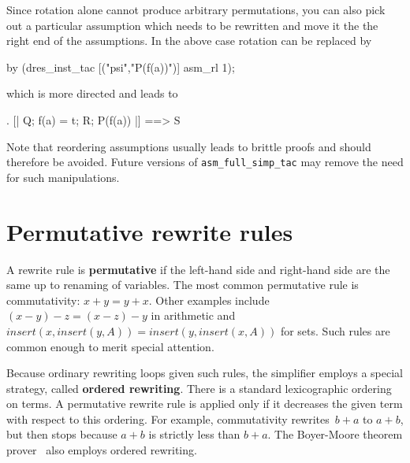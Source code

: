 Since rotation alone cannot produce arbitrary permutations, you can also pick
out a particular assumption which needs to be rewritten and move it the the
right end of the assumptions. In the above case rotation can be replaced by
\begin{ttbox}
by (dres_inst_tac [("psi","P(f(a))")] asm_rl 1);
\end{ttbox}
which is more directed and leads to
\begin{ttbox}
{. [| Q; f(a) = t; R; P(f(a)) |] ==> S}
\end{ttbox}

Note that reordering assumptions usually leads to brittle proofs and should
therefore be avoided. Future versions of \verb$asm_full_simp_tac$ may remove
the need for such manipulations.

\section{Permutative rewrite rules}

A rewrite rule is {\bf permutative} if the left-hand side and right-hand
side are the same up to renaming of variables.  The most common permutative
rule is commutativity: $x+y = y+x$.  Other examples include $(x-y)-z =
(x-z)-y$ in arithmetic and $insert(x,insert(y,A)) = insert(y,insert(x,A))$
for sets.  Such rules are common enough to merit special attention.

Because ordinary rewriting loops given such rules, the simplifier employs a
special strategy, called {\bf ordered rewriting}.
There is a standard lexicographic ordering on terms.  A permutative rewrite
rule is applied only if it decreases the given term with respect to this
ordering.  For example, commutativity rewrites~$b+a$ to $a+b$, but then
stops because $a+b$ is strictly less than $b+a$.  The Boyer-Moore theorem
prover~\cite{bm88book} also employs ordered rewriting.

